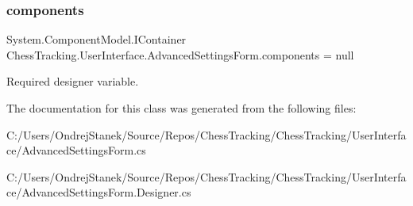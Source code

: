 \subsubsection{\texorpdfstring{components}{components}}
{\footnotesize\ttfamily System.\+Component\+Model.\+I\+Container Chess\+Tracking.\+User\+Interface.\+Advanced\+Settings\+Form.\+components = null\hspace{0.3cm}{\ttfamily [private]}}



Required designer variable. 



The documentation for this class was generated from the following files\+:\begin{DoxyCompactItemize}
\item 
C\+:/\+Users/\+Ondrej\+Stanek/\+Source/\+Repos/\+Chess\+Tracking/\+Chess\+Tracking/\+User\+Interface/Advanced\+Settings\+Form.\+cs\item 
C\+:/\+Users/\+Ondrej\+Stanek/\+Source/\+Repos/\+Chess\+Tracking/\+Chess\+Tracking/\+User\+Interface/Advanced\+Settings\+Form.\+Designer.\+cs\end{DoxyCompactItemize}
